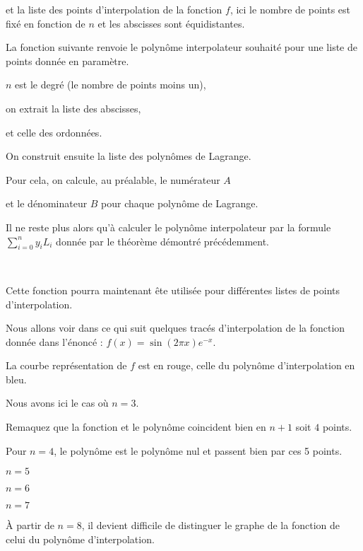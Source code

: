 \change
et la liste des points d'interpolation de la fonction $f$, ici le nombre de points est fixé en fonction de $n$ et les abscisses sont équidistantes.


\diapo

La fonction suivante renvoie le polynôme interpolateur souhaité pour une liste de points donnée en paramètre.

$n$ est le degré (le nombre de points moins un),

on extrait la liste des abscisses,

et celle des ordonnées.

\change

On construit ensuite la liste des polynômes de Lagrange.

Pour cela, on calcule, au préalable, le numérateur $A$

et le dénominateur $B$ pour chaque polynôme de Lagrange.

\change
Il ne reste plus alors qu'à calculer le polynôme interpolateur par 
la formule $\displaystyle \sum_{i=0}^{n} y_i L_i$ donnée par le théorème démontré précédemment.

~

Cette fonction pourra maintenant ête utilisée pour différentes listes de points d'interpolation.

\diapo
Nous allons voir dans ce qui suit quelques tracés d'interpolation de la fonction donnée dans l'énoncé : $f(x) = \sin(2\pi x)e^{-x}$.

La courbe représentation de $f$ est en rouge, celle du polynôme d'interpolation en bleu.

Nous avons ici le cas où $n=3$.
  
  Remaquez que la fonction et le polynôme coincident bien en $n+1$ soit $4$ points.
  
  \change
  Pour $n=4$, le polynôme est le polynôme nul et passent bien par ces 5 points.
  
\change
  
$n=5$

\change

$n=6$

\change

$n=7$

\change

  À partir de $n=8$, il devient difficile de distinguer le
  graphe de la fonction de celui du polynôme d'interpolation.





